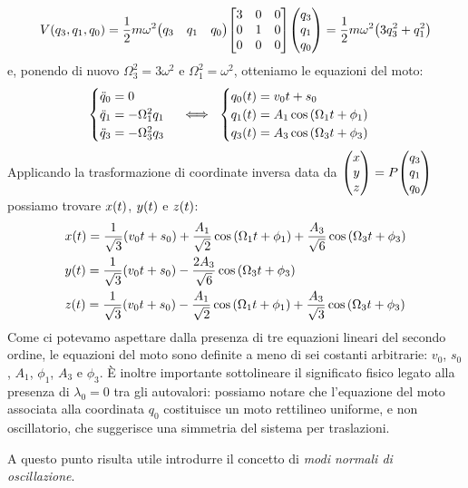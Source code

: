             $$V(q_3,q_1,q_0)=\frac{1}{2}m\omega^2\mqty(q_3 & q_1 & q_0)\mqty[\dmat[0]{3,1,0}]\mqty(q_3 \\ q_1 \\ q_0)=\frac{1}{2}m\omega^2\qty(3q_3^2+q_1^2)$$
        e, ponendo di nuovo $\Omega_3^2=3\omega^2$ e $\Omega_1^2=\omega^2$, otteniamo le equazioni del moto:
        \begin{equation*}
        \begin{cases}
            \ddot{q}_0=0\\
            \ddot{q}_1=-\Omega_1^2q_1\\
            \ddot{q}_3=-\Omega_3^2q_3
        \end{cases}
        \iff\
        \begin{cases}
            q_0\qty(t)=v_0t+s_0\\
            q_1\qty(t)=A_1\cos\qty(\Omega_1 t+\phi_1)\\
            q_3\qty(t)=A_3\cos\qty(\Omega_3 t+\phi_3)
        \end{cases}
        \end{equation*}
        Applicando la trasformazione di coordinate inversa data da $\mqty(x \\ y \\ z)=P\mqty(q_3 \\ q_1 \\ q_0)$ possiamo trovare $x\qty(t)$, $y\qty(t)$ e $z\qty(t)$:
        \begin{align*}
            &x\qty(t)=\frac{1}{\sqrt{3}}\qty(v_0t+s_0)+\frac{A_1}{\sqrt{2}}\cos\qty(\Omega_1t+\phi_1)+\frac{A_3}{\sqrt{6}}\cos\qty(\Omega_3t+\phi_3)\\
            &y\qty(t)=\frac{1}{\sqrt{3}}\qty(v_0t+s_0)-\frac{2A_3}{\sqrt{6}}\cos\qty(\Omega_3t+\phi_3)\\
            &z\qty(t)=\frac{1}{\sqrt{3}}\qty(v_0t+s_0)-\frac{A_1}{\sqrt{2}}\cos\qty(\Omega_1t+\phi_1)+\frac{A_3}{\sqrt{3}}\cos\qty(\Omega_3t+\phi_3)
        \end{align*}
        Come ci potevamo aspettare dalla presenza di tre equazioni lineari del secondo ordine, le equazioni del moto sono definite a meno di sei costanti arbitrarie: $v_0$, $s_0$, $A_1$, $\phi_1$, $A_3$ e $\phi_3$. \`E inoltre importante sottolineare il significato fisico legato alla presenza di $\lambda_0=0$ tra gli autovalori: possiamo notare che l'equazione del moto associata alla coordinata $q_0$ costituisce un moto rettilineo uniforme, e non oscillatorio, che suggerisce una simmetria del sistema per traslazioni. \par A questo punto risulta utile introdurre il concetto di \emph{modi normali di oscillazione}.
